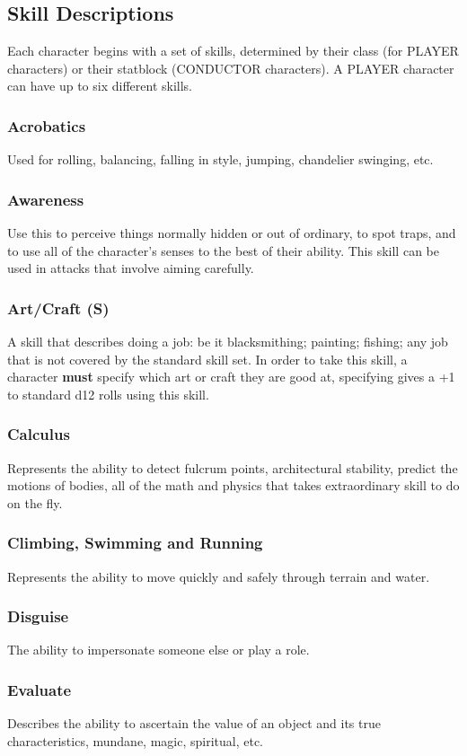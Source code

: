 \subsection{Skill Descriptions}
Each character begins with a set of skills, determined by their class (for PLAYER characters) or their statblock (CONDUCTOR characters). A PLAYER character can have up to six different skills.
\begin{multicols}{2}
\subsubsection*{Acrobatics}
Used for rolling, balancing, falling in style, jumping, chandelier swinging, etc.
\subsubsection*{Awareness}
Use this to perceive things normally hidden or out of ordinary, to spot traps, and to use all of the character's senses to the best of their ability. This skill can be used in attacks that involve aiming carefully.
\subsubsection*{Art/Craft (S)}
A skill that describes doing a job: be it blacksmithing; painting; fishing; any job that is not covered by the standard skill set. In order to take this skill, a character \textbf{must} specify which art or craft they are good at, specifying gives a +1 to standard d12 rolls using this skill.
\subsubsection*{Calculus}
Represents the ability to detect fulcrum points, architectural stability, predict the motions of bodies, all of the math and physics that takes extraordinary skill to do on the fly.
\subsubsection*{Climbing, Swimming and Running}
Represents the ability to move quickly and safely through terrain and water.
\subsubsection*{Disguise}
The ability to impersonate someone else or play a role.
\subsubsection*{Evaluate}
Describes the ability to ascertain the value of an object and its true characteristics, mundane, magic, spiritual, etc.

\end{multicols}
